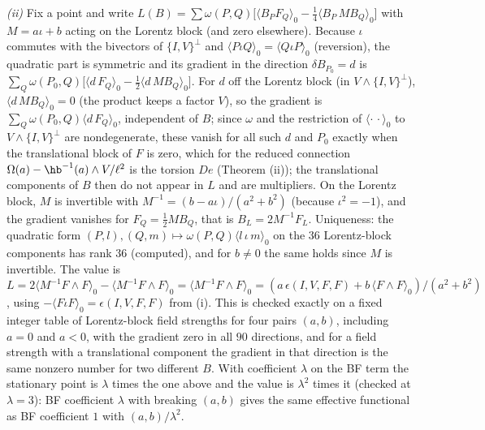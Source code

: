 \emph{(ii)} Fix a point and write $L(B) = \sum\omega(P, Q)\big[\langle B_{P}F_{Q}\rangle_{0} - \tfrac14\langle B_{P}\,M B_{Q}\rangle_{0}\big]$ with $M = a\iota + b$ acting on the Lorentz block (and zero elsewhere). Because $\iota$ commutes with the bivectors of $\{I, V\}^{\perp}$ and $\langle P\iota Q\rangle_{0} = \langle Q\iota P\rangle_{0}$ (reversion), the quadratic part is symmetric and its gradient in the direction $\delta B_{P_{0}} = d$ is $\sum_{Q}\omega(P_{0}, Q)\big[\langle d\,F_{Q}\rangle_{0} - \tfrac12\langle d\,M B_{Q}\rangle_{0}\big]$. For $d$ off the Lorentz block (in $V \wedge \{I, V\}^{\perp}$), $\langle d\,M B_{Q}\rangle_{0} = 0$ (the product keeps a factor $V$), so the gradient is $\sum_{Q}\omega(P_{0}, Q)\langle d\,F_{Q}\rangle_{0}$, independent of $B$; since $\omega$ and the restriction of $\langle\cdot\,\cdot\rangle_{0}$ to $V \wedge \{I, V\}^{\perp}$ are nondegenerate, these vanish for all such $d$ and $P_{0}$ exactly when the translational block of $F$ is zero, which for the reduced connection $\Omega(a) - \hb^{-1}(a)\wedge V/\ell^{2}$ is the torsion $De$ (Theorem (ii)); the translational components of $B$ then do not appear in $L$ and are multipliers. On the Lorentz block, $M$ is invertible with $M^{-1} = (b - a\iota)/(a^{2} + b^{2})$ (because $\iota^{2} = -1$), and the gradient vanishes for $F_{Q} = \tfrac12 M B_{Q}$, that is $B_{L} = 2M^{-1}F_{L}$. Uniqueness: the quadratic form $(P, l), (Q, m) \mapsto \omega(P, Q)\langle l\,\iota\,m\rangle_{0}$ on the $36$ Lorentz-block components has rank $36$ (computed), and for $b \neq 0$ the same holds since $M$ is invertible. The value is $L = 2\langle M^{-1}F\wedge F\rangle_{0} - \langle M^{-1}F\wedge F\rangle_{0} = \langle M^{-1}F \wedge F\rangle_{0} = (a\,\epsilon(I, V, F, F) + b\,\langle F\wedge F\rangle_{0})/(a^{2} + b^{2})$, using $-\langle F\iota F\rangle_{0} = \epsilon(I, V, F, F)$ from (i). This is checked exactly on a fixed integer table of Lorentz-block field strengths for four pairs $(a, b)$, including $a = 0$ and $a < 0$, with the gradient zero in all $90$ directions, and for a field strength with a translational component the gradient in that direction is the same nonzero number for two different $B$. With coefficient $\lambda$ on the BF term the stationary point is $\lambda$ times the one above and the value is $\lambda^{2}$ times it (checked at $\lambda = 3$): BF coefficient $\lambda$ with breaking $(a, b)$ gives the same effective functional as BF coefficient $1$ with $(a, b)/\lambda^{2}$.

